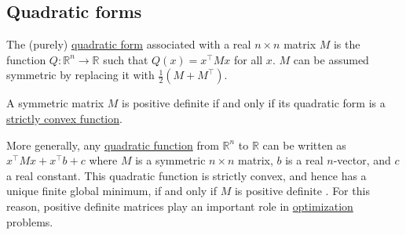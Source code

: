 
\hypertarget{quadratic-forms}{%
\subsection{Quadratic forms}\label{quadratic-forms}}

The (purely) \href{quadratic_form}{quadratic form} associated with a
real \(n \times n\) matrix \(M\) is the function
\(Q : \mathbb{R}^n \to \mathbb{R}\) such that \(Q(x) = x^\top  Mx\)
for all \(x\). \(M\) can be assumed symmetric by replacing it with
\(\tfrac{1}{2} \left(M + M^\top \right)\).

A symmetric matrix \(M\) is positive definite if and only if its
quadratic form is a \href{strictly_convex_function}{strictly convex
function}.

More generally, any \href{quadratic_function}{quadratic function} from
\(\mathbb{R}^n\) to \(\mathbb{R}\) can be written as
\(x^\top  Mx + x^\top  b + c\) where \(M\) is a symmetric
\(n \times n\) matrix, \(b\) is a real \(n\)-vector, and \(c\) a real
constant. This quadratic function is strictly convex, and hence has a
unique finite global minimum, if and only if \(M\) is positive definite
. For this reason, positive definite matrices play an important role in
\href{optimization_(mathematics)}{optimization} problems.

